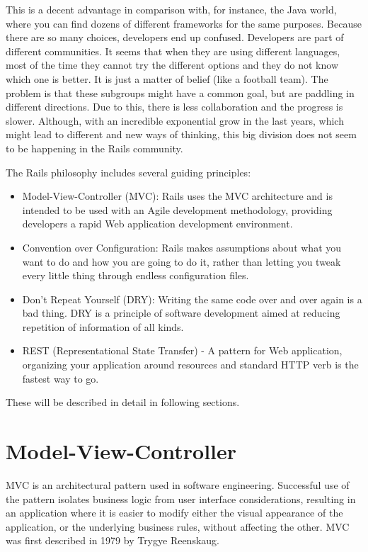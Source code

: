 This is a decent advantage in comparison with, for instance, the Java world, 
where you can find dozens of different frameworks for the same purposes.
Because there are so many choices, developers end up confused.
Developers are part of different communities. 
It seems that when they are using different languages, most of the time
they cannot try the different options and they do not know which one is better. 
It is just a matter of belief (like a football team).
The problem is that these subgroups might have a common goal, but
are paddling in different directions.
Due to this, there is less collaboration and the progress is slower.
Although, with an incredible exponential grow in the last years,
which might lead to different and new ways of thinking, 
this big division does not seem to be happening in the Rails community.

The Rails philosophy includes several guiding principles:
\begin{itemize}
\item Model-View-Controller (MVC): Rails uses the MVC architecture and 
      is intended to be used with an Agile development methodology,
      providing developers a rapid Web application development environment.
\item Convention over Configuration: Rails makes assumptions about 
      what you want to do and how you are going to do it, 
      rather than letting you tweak every little thing through endless configuration files.
\item Don’t Repeat Yourself (DRY): Writing the same code over and over again is a bad thing. 
      DRY is a principle of software development aimed at reducing repetition of information of all kinds.
\item REST (Representational State Transfer) - A pattern for Web application, 
      organizing your application around resources and standard HTTP verb is the fastest way to go.
\end{itemize}
These will be described in detail in following sections.


\section{Model-View-Controller} 
MVC is an architectural pattern used in software engineering. 
Successful use of the pattern isolates business logic from user interface considerations, 
resulting in an application where it is easier to modify either the visual appearance of the application, 
or the underlying business rules, without affecting the other.
MVC was first described in 1979 by Trygye Reenskaug.


